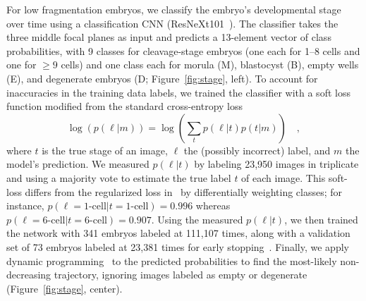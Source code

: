 
 For low fragmentation embryos, we classify the embryo's developmental stage over time using a classification CNN (ResNeXt101~\cite{xie2017aggregated}). The classifier takes the three middle focal planes as input and predicts a 13-element vector of class probabilities, with 9 classes for cleavage-stage embryos (one each for 1--8 cells and one for $\ge 9$ cells) and one class each for morula (M), blastocyst (B), empty wells (E), and degenerate embryos (D; Figure~\ref{fig:stage}, left). To account for inaccuracies in the training data labels, we trained the classifier with a soft loss function modified from the standard cross-entropy loss
\begin{equation}
\log \left( p(\ell | m) \right) = \log \left( \sum_{t} p(\ell | t) p(t | m) \right) \quad ,
\label{eqn:softloss}
\end{equation}
where $t$ is the true stage of an image, $\ell$ the (possibly incorrect) label, and $m$ the model's prediction. We measured $p(\ell | t)$ by labeling 23,950 images in triplicate and using a majority vote to estimate the true label $t$ of each image. This soft-loss differs from the regularized loss in~\cite{szegedy2016rethinking} by differentially weighting classes; for instance, $p(\ell = \textrm{1-cell} | t = \textrm{1-cell}) = 0.996$ whereas $p(\ell = \textrm{6-cell} | t = \textrm{6-cell}) = 0.907$. Using the measured $p(\ell | t)$, we then trained the network with 341 embryos labeled at 111,107 times, along with a validation set of 73 embryos labeled at 23,381 times for early stopping~\cite{goodfellow2016deep}. Finally, we apply dynamic programming~\cite{bellman1966dynamic} to the predicted probabilities to find the most-likely non-decreasing trajectory, ignoring images labeled as empty or degenerate (Figure~\ref{fig:stage}, center).

